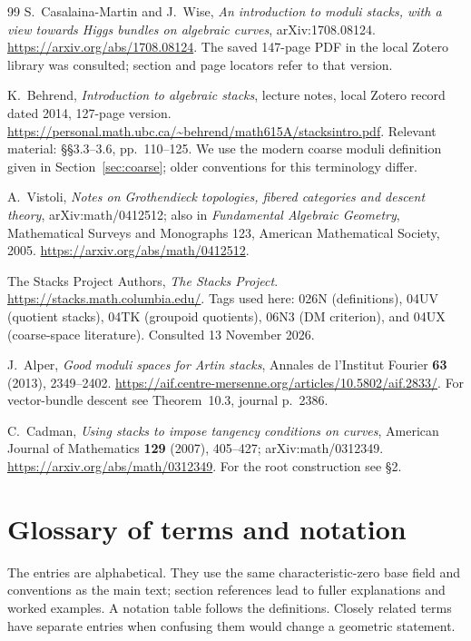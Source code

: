 \documentclass[11pt,a4paper]{article}
\numberwithin{equation}{section}
\theoremstyle{definition}
\begin{document}
\begin{thebibliography}{99}
S.~Casalaina-Martin and J.~Wise,
\emph{An introduction to moduli stacks, with a view towards Higgs bundles
on algebraic curves}, arXiv:1708.08124.
\url{https://arxiv.org/abs/1708.08124}.
The saved 147-page PDF in the local Zotero library was consulted;
section and page locators refer to that version.

K.~Behrend, \emph{Introduction to algebraic stacks}, lecture notes,
local Zotero record dated 2014, 127-page version.
\url{https://personal.math.ubc.ca/~behrend/math615A/stacksintro.pdf}.
Relevant material: \S\S3.3--3.6, pp.~110--125. We use the modern coarse
moduli definition given in Section~\ref{sec:coarse}; older conventions
for this terminology differ.

A.~Vistoli, \emph{Notes on Grothendieck topologies, fibered categories
and descent theory}, arXiv:math/0412512; also in
\emph{Fundamental Algebraic Geometry}, Mathematical Surveys and
Monographs 123, American Mathematical Society, 2005.
\url{https://arxiv.org/abs/math/0412512}.

The Stacks Project Authors, \emph{The Stacks Project}.
\url{https://stacks.math.columbia.edu/}.
Tags used here: 026N (definitions), 04UV (quotient stacks),
04TK (groupoid quotients), 06N3 (DM criterion), and 04UX (coarse-space
literature). Consulted 13 November 2026.

J.~Alper, \emph{Good moduli spaces for Artin stacks},
Annales de l'Institut Fourier \textbf{63} (2013), 2349--2402.
\url{https://aif.centre-mersenne.org/articles/10.5802/aif.2833/}.
For vector-bundle descent see Theorem~10.3, journal p.~2386.

C.~Cadman, \emph{Using stacks to impose tangency conditions on curves},
American Journal of Mathematics \textbf{129} (2007), 405--427;
arXiv:math/0312349.
\url{https://arxiv.org/abs/math/0312349}.
For the root construction see \S2.
\end{thebibliography}

\clearpage
\section{Glossary of terms and notation}
\label{sec:glossary}

The entries are alphabetical. They use the same characteristic-zero base
field and conventions as the main text; section references lead to fuller
explanations and worked examples. A notation table follows the definitions.
Closely related terms have separate entries when confusing them would
change a geometric statement.
\end{document}
